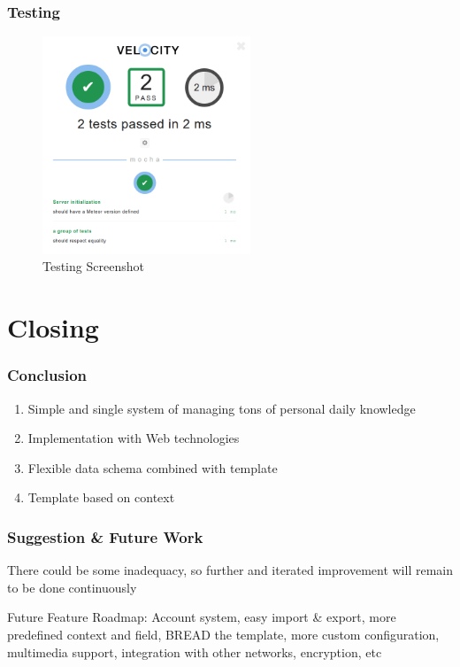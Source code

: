 \documentclass[10pt, compress]{beamer}
\begin{document}

\begin{frame}[fragile]
  \frametitle{Testing}

  \begin{figure}[ht]
    \centering
    \includegraphics[height=6.5cm]{include/satellid-app-test.png}
    \caption{Testing Screenshot}
    \label{fig:satellid-app-test}
  \end{figure}

\end{frame}


\section{Closing}


\begin{frame}[fragile]
  \frametitle{Conclusion}

  \begin{enumerate}
    \item Simple and single system of managing tons of personal daily knowledge
    \item Implementation with Web technologies
    \item Flexible data schema combined with template
    \item Template based on context
  \end{enumerate}

\end{frame}


\begin{frame}[fragile]
  \frametitle{Suggestion \& Future Work}

  There could be some inadequacy, so further and iterated improvement will remain to be done continuously

  \begin{block}{Future Feature Roadmap:}
    Account system, easy import \& export, more predefined context and field, BREAD the template, more custom configuration, multimedia support, integration with other networks, encryption, etc
  \end{block}

\end{frame}



\end{document}
